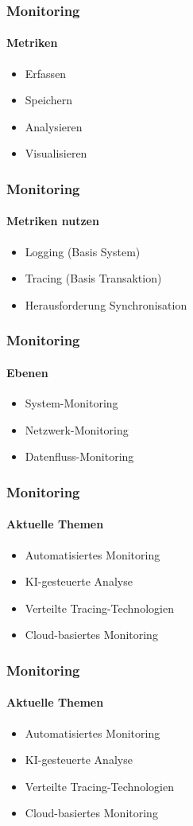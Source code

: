 \begin{frame}
  \frametitle{Monitoring}
  \framesubtitle{Metriken }
  \begin{itemize}
    \item Erfassen
    \item Speichern
    \item Analysieren
    \item Visualisieren
  \end{itemize}
\end{frame}

\begin{frame}
  \frametitle{Monitoring}
  \framesubtitle{Metriken nutzen}
  \begin{itemize}
    \item Logging (Basis System)
    \item Tracing (Basis Transaktion)
    \item Herausforderung Synchronisation
  \end{itemize}
\end{frame}

\begin{frame}
  \frametitle{Monitoring}
  \framesubtitle{Ebenen}
  \begin{itemize}
    \item System-Monitoring
    \item Netzwerk-Monitoring
    \item Datenfluss-Monitoring
  \end{itemize}
\end{frame}

\begin{frame}
  \frametitle{Monitoring}
  \framesubtitle{Aktuelle Themen}
  \begin{itemize}
    \item Automatisiertes Monitoring
    \item KI-gesteuerte Analyse
    \item Verteilte Tracing-Technologien
    \item Cloud-basiertes Monitoring
  \end{itemize}
\end{frame}

\begin{frame}
  \frametitle{Monitoring}
  \framesubtitle{Aktuelle Themen}
  \begin{itemize}
    \item Automatisiertes Monitoring
    \item KI-gesteuerte Analyse
    \item Verteilte Tracing-Technologien
    \item Cloud-basiertes Monitoring
  \end{itemize}
\end{frame}


